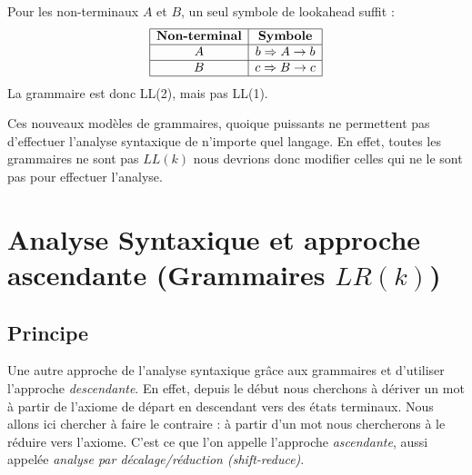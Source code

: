 \begin{example}
        Pour les non-terminaux $A$ et $B$, un seul symbole de lookahead suffit :
        \[
            \begin{array}{|c|c|}
                \hline
                \textbf{Non-terminal} & \textbf{Symbole} \\
                \hline
                A & b \Rightarrow A \to b \\
                \hline
                B & c \Rightarrow B \to c \\
                \hline
            \end{array}
        \]
    La grammaire est donc {LL(2)}, mais pas LL(1).
\end{example}

Ces nouveaux modèles de grammaires, quoique puissants ne permettent pas d'effectuer l'analyse syntaxique 
de n'importe quel langage. En effet, toutes les grammaires ne sont pas $LL(k)$ nous devrions donc 
modifier celles qui ne le sont pas pour effectuer l'analyse. 


\section{Analyse Syntaxique et approche ascendante (Grammaires $LR(k)$)}

\subsection{Principe}

Une autre approche de l'analyse syntaxique grâce aux grammaires et d'utiliser l'approche \emph{descendante}.
En effet, depuis le début nous cherchons à dériver un mot à partir de l'axiome de départ en descendant 
vers des états terminaux. Nous allons ici chercher à faire le contraire : à partir d'un mot nous chercherons 
à le réduire vers l'axiome. C'est ce que l'on appelle l'approche \emph{ascendante}, aussi appelée 
\emph{analyse par décalage/réduction (shift-reduce)}. 

